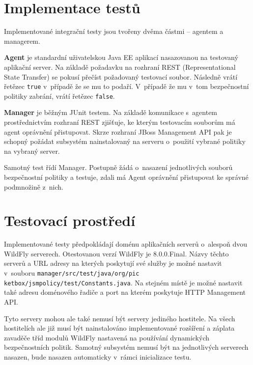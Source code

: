 \section{Implementace testů} %

Implementované integrační testy jsou tvořeny dvěma částmi -- agentem a managerem.

{\bf Agent} je standardní uživatelskou Java EE aplikací nasazovanou na testovaný aplikační server. Na základě požadavku na rozhraní REST (Representational State Transfer) se pokusí přečíst požadovaný testovací soubor. Následně vrátí řetězec {\tt true} v~případě že se mu to podaří. V~případě že mu v~tom bezpečnostní politiky zabrání, vrátí řetězec {\tt false}.

{\bf Manager} je běžným JUnit testem. Na základě komunikace s~agentem prostřednictvím rozhraní REST zjišťuje, ke kterým testovacím souborům má agent oprávnění přistupovat. Skrze rozhraní JBoss Management API pak je schopný požádat subsystém nainstalovaný na serveru o~použití vybrané politiky na vybraný server.

Samotný test řídí Manager. Postupně žádá o~nasazení jednotlivých souborů bezpečnostní politiky a testuje, zdali má Agent oprávnění přistupovat ke správné podmnožině z~nich.

\section{Testovací prostředí} %

Implementované testy předpokládají doménu aplikačních serverů o~alespoň dvou WildFly serverech. Otestovanou verzí WildFly je 8.0.0.Final.
Názvy těchto serverů a URL adresy na kterých poskytují své služby je možné nastavit v~souboru {\tt manager/src/test/java/org/pic ketbox/jsmpolicy/test/Constants.java}. Na stejném místě je možné nastavit také adresu doménového řadiče a port na kterém poskytuje HTTP Management API.

Tyto servery mohou ale také nemusí být servery jediného hostitele. Na všech hostitelích ale již musí být nainstalováno implementované rozšíření a záplata zavaděče tříd modulů WildFly nastavená na používání dynamických bezpečnostních politik. Samotný subsystém nemusí být na jednotlivých serverech nasazen, bude nasazen automaticky v~rámci inicializace testu.

